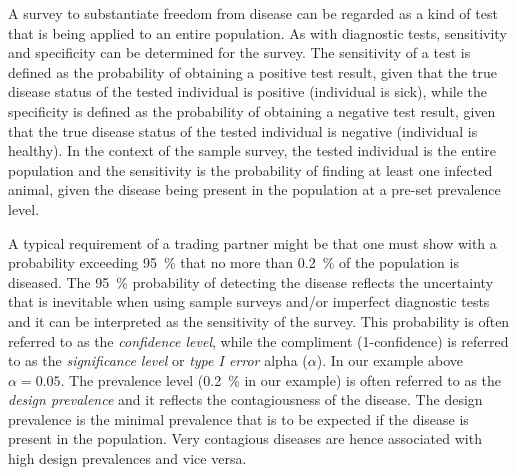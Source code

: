 \documentclass[nojss]{jss}
\begin{document}
A survey to substantiate freedom from disease can be regarded as a kind of test that is being applied to an entire population. As with diagnostic tests, sensitivity and specificity can be determined for the survey. The sensitivity    of a test is defined as the probability of obtaining a positive test result, given that the true disease status of the tested individual is positive (individual is sick), while the specificity  is defined as the probability of obtaining a negative test result, given that the true disease status of the tested individual is negative (individual is healthy). In the context of the sample survey, the tested individual is the entire population and the sensitivity is the probability of finding at least one infected animal, given the disease being present in the population at a pre-set prevalence level.

A typical requirement of a trading partner might be that one must show with a probability exceeding 95~\% that no more than 0.2~\% of the population is diseased. The 95~\% probability of detecting the disease reflects the uncertainty that is inevitable when using sample surveys and/or imperfect diagnostic tests and it can be interpreted as the sensitivity of the survey. This probability is often referred to as the \emph{confidence level},  while the compliment (1-confidence) is referred to as the \emph{significance level}  or   \emph{type I error} alpha ($\alpha$). In our example above $\alpha = 0.05$. The prevalence level (0.2~\% in our example) is often referred to as the \emph{design prevalence}   and it reflects the contagiousness of the disease. The design prevalence is the minimal prevalence that is to be expected if the disease is present in the population. Very contagious diseases are hence associated with high design prevalences and vice versa.
\end{document}

